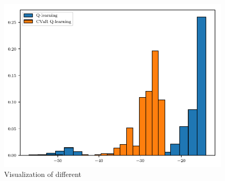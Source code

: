 \begin{figure}[h]
\center
\includegraphics[width=0.6\linewidth]{gfx/sample_hist.pdf}
\caption{Visualization of different}
\label{fig:qhist}
\end{figure}



